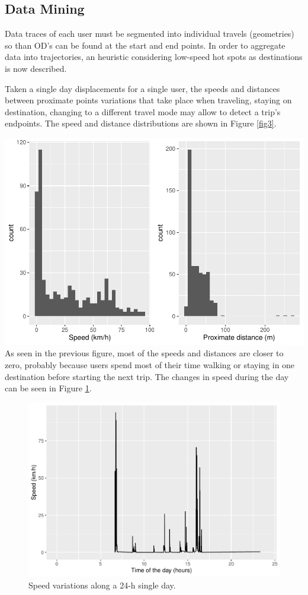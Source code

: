 \documentclass[]{elsarticle} %
\begin{document}
\hypertarget{data-mining}{%
\subsection{Data Mining}\label{data-mining}}

Data traces of each user must be segmented into individual travels
(geometries) so than OD's can be found at the start and end points. In
order to aggregate data into trajectories, an heuristic considering
low-speed hot spots as destinations is now described.

Taken a single day displacements for a single user, the speeds and
distances between proximate points variations that take place when
traveling, staying on destination, changing to a different travel mode
may allow to detect a trip's endpoints. The speed and distance
distributions are shown in Figure \ref{fig3}.

\includegraphics{Elsevier_files/figure-latex/speed-plot-1.pdf} As seen
in the previous figure, most of the speeds and distances are closer to
zero, probably because users spend most of their time walking or staying
in one destination before starting the next trip. The changes in speed
during the day can be seen in Figure \ref{fig4}.

\begin{figure}
\centering
\includegraphics{Elsevier_files/figure-latex/speed-hour-plot-1.pdf}
\caption{\label{fig4}Speed variations along a 24-h single day.}
\end{figure}
\end{document}

